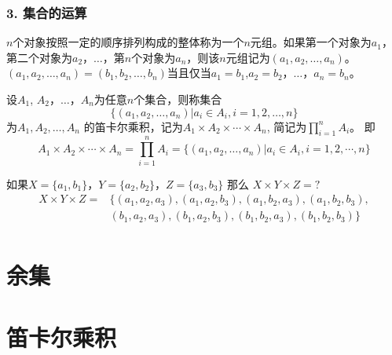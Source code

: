 \documentclass{beamer}
\begin{document}
\begin{CJK*}{UTF8}{gbsn}
\begin{frame}
  \frametitle{3. 集合的运算}
  \begin{Def}
    $n$个对象按照一定的顺序排列构成的整体称为一个\alert{$n$元组}。如果第一个对象为$a_1$，第二个对象为$a_2$，$\ldots$，第$n$个对象为$a_n$，则该$n$元组记为$(a_1,a_2, \ldots, a_n)$。
$(a_1,a_2, \ldots, a_n)=(b_1,b_2, \ldots, b_n)$当且仅当$a_1=b_1$,$a_2=b_2$，$\ldots$，$a_n=b_n$。
  \end{Def}\pause
  \begin{Def}
    设$A_1$, $A_2$，$\ldots$，$A_n$为任意$n$个集合，则称集合 \[\{(a_1,a_2, \ldots, a_n)|a_i\in A_i, i = 1,2,\ldots, n\}\] 为$A_1, A_2, \ldots, A_n$ 的\alert{笛卡尔乘积}，记为$A_1 \times A_2 \times \cdots \times A_n$, 简记为$\prod_{i=1}^nA_i$。
即\small{\vspace{-0.4cm}
\begin{equation*}
  A_1 \times A_2 \times \cdots \times A_n = \prod_{i=1}^nA_i = \{(a_1,a_2, \ldots, a_n)|a_i \in A_i, i = 1, 2, \cdots, n\}
\end{equation*}}
  \end{Def}\pause
\vspace{-0.6cm}
  \begin{Ex}
    如果$X=\{a_1,b_1\}$，$Y=\{a_2,b_2\}$，$Z=\{a_3,b_3\}$ 那么 $X \times Y \times Z = ?$
\small{
    \begin{equation*}
      \begin{split}
       X \times Y \times Z =& \{ (a_1,a_2, a_3), (a_1,a_2, b_3), (a_1, b_2, a_3), (a_1,b_2, b_3), \\
&(b_1, a_2, a_3), (b_1, a_2, b_3), (b_1, b_2, a_3), (b_1, b_2, b_3) \}\\
      \end{split}
    \end{equation*}}
  \end{Ex}
\end{frame}

\section{余集}
\section{笛卡尔乘积}

\end{CJK*}
\end{document}
